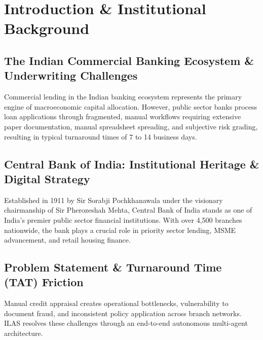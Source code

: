 \documentclass[11pt,a4paper,oneside]{report}
\begin{document}
\newpage

\setcounter{page}{1}

\chapter{Introduction \& Institutional Background}

\section{The Indian Commercial Banking Ecosystem \& Underwriting Challenges}
Commercial lending in the Indian banking ecosystem represents the primary engine of macroeconomic capital allocation. However, public sector banks process loan applications through fragmented, manual workflows requiring extensive paper documentation, manual spreadsheet spreading, and subjective risk grading, resulting in typical turnaround times of 7 to 14 business days.

\section{Central Bank of India: Institutional Heritage \& Digital Strategy}
Established in 1911 by Sir Sorabji Pochkhanawala under the visionary chairmanship of Sir Pherozeshah Mehta, Central Bank of India stands as one of India's premier public sector financial institutions. With over 4,500 branches nationwide, the bank plays a crucial role in priority sector lending, MSME advancement, and retail housing finance.

\section{Problem Statement \& Turnaround Time (TAT) Friction}
Manual credit appraisal creates operational bottlenecks, vulnerability to document fraud, and inconsistent policy application across branch networks. ILAS resolves these challenges through an end-to-end autonomous multi-agent architecture.

\end{document}
